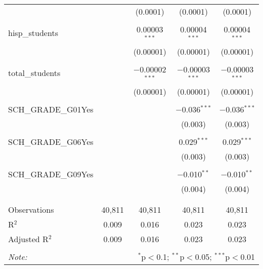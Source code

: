 \begin{table}[!htbp]
\begin{tabular}{@{\extracolsep{-2pt}}lcccc}
  &  & (0.0001) & (0.0001) & (0.0001) \\ 
  & & & & \\ 
 hisp\_students &  & 0.00003$^{***}$ & 0.00004$^{***}$ & 0.00004$^{***}$ \\ 
  &  & (0.00001) & (0.00001) & (0.00001) \\ 
  & & & & \\ 
 total\_students &  & $-$0.00002$^{***}$ & $-$0.00003$^{***}$ & $-$0.00003$^{***}$ \\ 
  &  & (0.00001) & (0.00001) & (0.00001) \\ 
  & & & & \\ 
 SCH\_GRADE\_G01Yes &  &  & $-$0.036$^{***}$ & $-$0.036$^{***}$ \\ 
  &  &  & (0.003) & (0.003) \\ 
  & & & & \\ 
 SCH\_GRADE\_G06Yes &  &  & 0.029$^{***}$ & 0.029$^{***}$ \\ 
  &  &  & (0.003) & (0.003) \\ 
  & & & & \\ 
 SCH\_GRADE\_G09Yes &  &  & $-$0.010$^{**}$ & $-$0.010$^{**}$ \\ 
  &  &  & (0.004) & (0.004) \\ 
  & & & & \\ 
\hline \\[-1.8ex] 
Observations & 40,811 & 40,811 & 40,811 & 40,811 \\ 
R$^{2}$ & 0.009 & 0.016 & 0.023 & 0.023 \\ 
Adjusted R$^{2}$ & 0.009 & 0.016 & 0.023 & 0.023 \\ 
\hline 
\hline \\[-1.8ex] 
\textit{Note:}  & \multicolumn{4}{r}{$^{*}$p$<$0.1; $^{**}$p$<$0.05; $^{***}$p$<$0.01} \\ 
\end{tabular} 
\end{table} 
